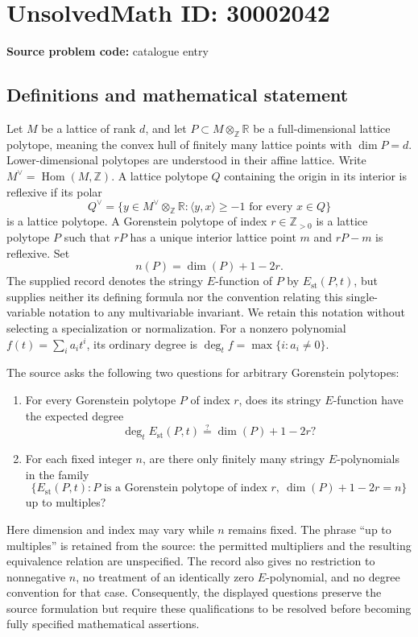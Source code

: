 \documentclass[11pt]{article}
\newcommand{\Z}{\mathbb{Z}}
\newcommand{\R}{\mathbb{R}}
\begin{document}
\section*{UnsolvedMath ID: 30002042}
\textbf{Source problem code:} catalogue entry
\subsection{Definitions and mathematical statement}
Let \(M\) be a lattice of rank \(d\), and let \(P\subset M\otimes_{\Z}\R\) be a full-dimensional lattice polytope, meaning the convex hull of finitely many lattice points with \(\dim P=d\). Lower-dimensional polytopes are understood in their affine lattice. Write \(M^{\vee}=\operatorname{Hom}(M,\Z)\). A lattice polytope \(Q\) containing the origin in its interior is reflexive if its polar
\[
Q^{\vee}=\{y\in M^{\vee}\otimes_{\Z}\R:\langle y,x\rangle\geq -1\text{ for every }x\in Q\}
\]
is a lattice polytope. A Gorenstein polytope of index \(r\in\Z_{>0}\) is a lattice polytope \(P\) such that \(rP\) has a unique interior lattice point \(m\) and \(rP-m\) is reflexive. Set
\[
n(P)=\dim(P)+1-2r.
\]
The supplied record denotes the stringy \(E\)-function of \(P\) by \(E_{\mathrm{st}}(P,t)\), but supplies neither its defining formula nor the convention relating this single-variable notation to any multivariable invariant. We retain this notation without selecting a specialization or normalization. For a nonzero polynomial \(f(t)=\sum_i a_i t^i\), its ordinary degree is \(\deg_t f=\max\{i:a_i\neq0\}\).

The source asks the following two questions for arbitrary Gorenstein polytopes:
\begin{enumerate}
\item For every Gorenstein polytope \(P\) of index \(r\), does its stringy \(E\)-function have the expected degree
\[
\deg_t E_{\mathrm{st}}(P,t)\stackrel{?}{=}\dim(P)+1-2r?
\]
\item For each fixed integer \(n\), are there only finitely many stringy \(E\)-polynomials in the family
\[
\bigl\{E_{\mathrm{st}}(P,t): P\text{ is a Gorenstein polytope of index }r,\ \dim(P)+1-2r=n\bigr\}
\]
up to multiples?
\end{enumerate}
Here dimension and index may vary while \(n\) remains fixed. The phrase ``up to multiples'' is retained from the source: the permitted multipliers and the resulting equivalence relation are unspecified. The record also gives no restriction to nonnegative \(n\), no treatment of an identically zero \(E\)-polynomial, and no degree convention for that case. Consequently, the displayed questions preserve the source formulation but require these qualifications to be resolved before becoming fully specified mathematical assertions.
\end{document}
